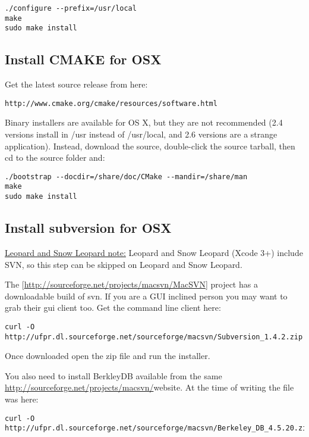 \begin{verbatim}
./configure --prefix=/usr/local 
make
sudo make install 
\end{verbatim}

\subsection{Install CMAKE for OSX}
Get the latest source release from here:

\begin{verbatim}
http://www.cmake.org/cmake/resources/software.html
\end{verbatim}

Binary installers are available for OS X, but they are not recommended
(2.4 versions install in /usr instead of /usr/local, and 2.6 versions are a
strange application). Instead, download the source, double-click the source tarball,
then cd to the source folder and:

\begin{verbatim}
./bootstrap --docdir=/share/doc/CMake --mandir=/share/man
make
sudo make install
\end{verbatim}

\subsection{Install subversion for OSX}
\underline{Leopard and Snow Leopard note:} Leopard and Snow Leopard (Xcode 3+)
include SVN, so this step can be skipped on Leopard and Snow Leopard.

The [\url{http://sourceforge.net/projects/macsvn/MacSVN}] project has a downloadable
build of svn. If you are a GUI inclined person you may want to grab their gui
client too. Get the command line client here:

\begin{verbatim}
curl -O http://ufpr.dl.sourceforge.net/sourceforge/macsvn/Subversion_1.4.2.zip 
\end{verbatim}

Once downloaded open the zip file and run the installer.

You also need to install BerkleyDB available from the same
\url {http://sourceforge.net/projects/macsvn/}{website}. At the time of writing the
file was here:

\begin{verbatim}
curl -O http://ufpr.dl.sourceforge.net/sourceforge/macsvn/Berkeley_DB_4.5.20.zip 
\end{verbatim}

